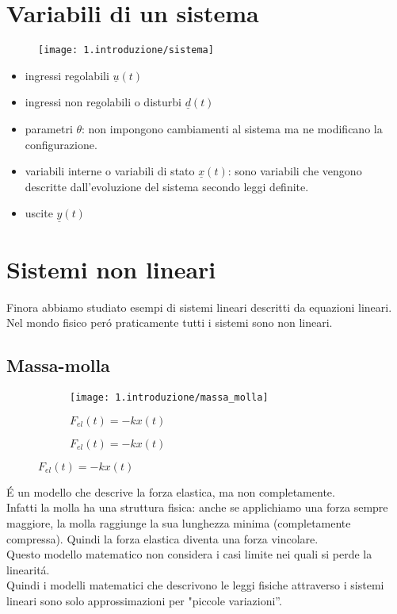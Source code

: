 \documentclass[../main.tex]{subfiles}
\begin{document}
		
	\section{Variabili di un sistema}
			\begin{figure}[h!]
				\centering
				\texttt{[image: 1.introduzione/sistema]}
			\end{figure}
			\begin{itemize}
				\item ingressi regolabili $ \underline u(t) $
				\item ingressi non regolabili o disturbi $ \underline d(t) $
				\item parametri $ \theta $: non impongono cambiamenti al sistema ma ne modificano la configurazione.
				\item variabili interne o variabili di stato $ \underline x(t) $: sono variabili che vengono descritte dall'evoluzione del sistema secondo leggi definite.
				\item uscite $ \underline y(t) $
			\end{itemize}
		
	\section{Sistemi non lineari}
		Finora abbiamo studiato esempi di sistemi lineari descritti da equazioni lineari. Nel mondo fisico per\'o praticamente tutti i sistemi sono non lineari.
		
	\subsection{Massa-molla}
		\begin{figure}[h!]
			\centering
			\begin{subfigure}[b]{0.4\linewidth}
				\texttt{[image: 1.introduzione/massa\_molla]}
				\caption{$F_{el}(t)=-kx(t)$}
			\end{subfigure}
			\begin{subfigure}[b]{0.4\linewidth}
				\caption{$F_{el}(t)=-kx(t)$}
			\end{subfigure}
		\end{figure}
		\'E un modello che descrive la forza elastica, ma non completamente.\\ Infatti la molla ha una struttura fisica: anche se applichiamo una forza sempre maggiore, la molla raggiunge la sua lunghezza minima (completamente compressa). Quindi la forza elastica diventa una forza vincolare.\\
		Questo modello matematico non considera i casi limite nei quali si perde la linearit\'a.\\
		Quindi i modelli matematici che descrivono le leggi fisiche attraverso i sistemi lineari sono solo approssimazioni per "piccole variazioni''.
		
\end{document}
